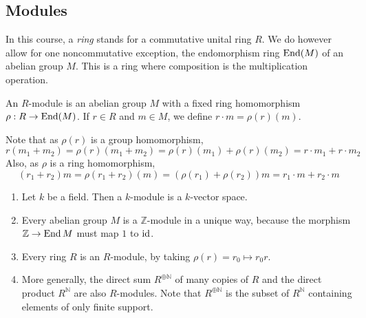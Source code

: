 \subsection{Modules}
In this course, a \emph{ring} stands for a commutative unital ring \( R \).
We do however allow for one noncommutative exception, the endomorphism ring \( \operatorname{End}(M) \) of an abelian group \( M \).
This is a ring where composition is the multiplication operation.
\begin{definition}
    An \( R \)-module is an abelian group \( M \) with a fixed ring homomorphism \( \rho : R \to \operatorname{End}(M) \).
    If \( r \in R \) and \( m \in M \), we define \( r \cdot m = \rho(r)(m) \).    
\end{definition}
\begin{remark}
    Note that as \( \rho(r) \) is a group homomorphism,
    \[ r(m_1 + m_2) = \rho(r)(m_1 + m_2) = \rho(r)(m_1) + \rho(r)(m_2) = r \cdot m_1 + r \cdot m_2 \]
    Also, as \( \rho \) is a ring homomorphism,
    \[ (r_1 + r_2)m = \rho(r_1 + r_2)(m) = (\rho(r_1) + \rho(r_2))m = r_1 \cdot m + r_2 \cdot m \]
\end{remark}
\begin{example}
    \begin{enumerate}
        \item Let \( k \) be a field.
        Then a \( k \)-module is a \( k \)-vector space.
        \item Every abelian group \( M \) is a \( \mathbb Z \)-module in a unique way, because the morphism \( \mathbb Z \to \operatorname{End} M \) must map \( 1 \) to \( \operatorname{id} \).
        \item Every ring \( R \) is an \( R \)-module, by taking \( \rho(r) = r_0 \mapsto r_0 r \).
        \item More generally, the direct sum \( R^{\oplus \mathbb N} \) of many copies of \( R \) and the direct product \( R^{\mathbb N} \) are also \( R \)-modules.
        Note that \( R^{\oplus \mathbb N} \) is the subset of \( R^{\mathbb N} \) containing elements of only finite support.
    \end{enumerate}
\end{example}

